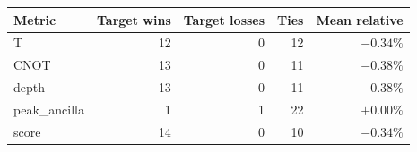 \begin{tabular}{lrrrr}
\toprule
Metric & Target wins & Target losses & Ties & Mean relative \\
\midrule
T & 12 & 0 & 12 & $-0.34\%$ \\
CNOT & 13 & 0 & 11 & $-0.38\%$ \\
depth & 13 & 0 & 11 & $-0.38\%$ \\
peak_ancilla & 1 & 1 & 22 & $+0.00\%$ \\
score & 14 & 0 & 10 & $-0.34\%$ \\
\bottomrule
\end{tabular}
